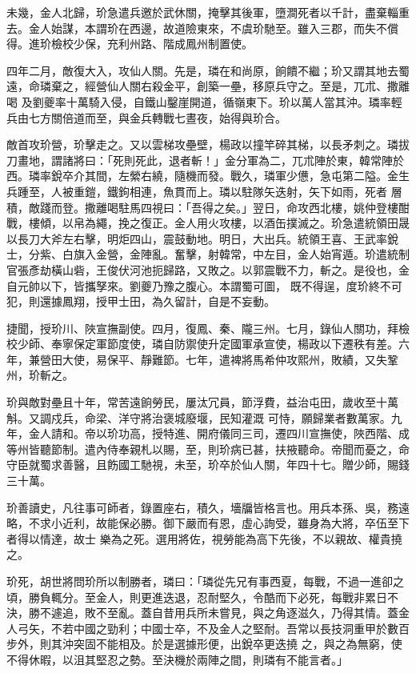 \begin{pinyinscope}
 未幾，金人北歸，玠急遣兵邀於武休關，掩擊其後軍，墮澗死者以千計，盡棄輜重去。金人始謀，本謂玠在西邊，故道險東來，不虞玠馳至。雖入三郡，而失不償得。進玠檢校少保，充利州路、階成鳳州制置使。



 四年二月，敵復大入，攻仙人關。先是，璘在和尚原，餉饋不繼；玠又謂其地去蜀遠，命璘棄之，經營仙人關右殺金平，創築一壘，移原兵守之。至是，兀朮、撒離喝
 及劉夔率十萬騎入侵，自鐵山鑿崖開道，循嶺東下。玠以萬人當其沖。璘率輕兵由七方關倍道而至，與金兵轉戰七晝夜，始得與玠合。



 敵首攻玠營，玠擊走之。又以雲梯攻壘壁，楊政以撞竿碎其梯，以長矛刺之。璘拔刀畫地，謂諸將曰：「死則死此，退者斬！」金分軍為二，兀朮陣於東，韓常陣於西。璘率銳卒介其間，左縈右繞，隨機而發。戰久，璘軍少憊，急屯第二隘。金生兵踵至，人被重鎧，鐵鉤相連，魚貫而上。璘以駐隊矢迭射，矢下如雨，死者
 層積，敵踐而登。撒離喝駐馬四視曰：「吾得之矣。」翌日，命攻西北樓，姚仲登樓酣戰，樓傾，以帛為繩，挽之復正。金人用火攻樓，以酒缶撲滅之。玠急遣統領田晟以長刀大斧左右擊，明炬四山，震鼓動地。明日，大出兵。統領王喜、王武率銳士，分紫、白旗入金營，金陣亂。奮擊，射韓常，中左目，金人始宵遁。玠遣統制官張彥劫橫山砦，王俊伏河池扼歸路，又敗之。以郭震戰不力，斬之。是役也，金自元帥以下，皆攜孥來。劉夔乃豫之腹心。本謂蜀可圖，
 既不得逞，度玠終不可犯，則還據鳳翔，授甲士田，為久留計，自是不妄動。



 捷聞，授玠川、陜宣撫副使。四月，復鳳、秦、隴三州。七月，錄仙人關功，拜檢校少師、奉寧保定軍節度使，璘自防禦使升定國軍承宣使，楊政以下遷秩有差。六年，兼營田大使，易保平、靜難節。七年，遣裨將馬希仲攻熙州，敗績，又失鞏州，玠斬之。



 玠與敵對壘且十年，常苦遠餉勞民，屢汰冗員，節浮費，益治屯田，歲收至十萬斛。又調戍兵，命梁、洋守將治褒城廢堰，民知灌溉
 可恃，願歸業者數萬家。九年，金人請和。帝以玠功高，授特進、開府儀同三司，遷四川宣撫使，陜西階、成等州皆聽節制。遣內侍奉親札以賜，至，則玠病已甚，扶掖聽命。帝聞而憂之，命守臣就蜀求善醫，且飭國工馳視，未至，玠卒於仙人關，年四十七。贈少師，賜錢三十萬。



 玠善讀史，凡往事可師者，錄置座右，積久，墻牖皆格言也。用兵本孫、吳，務遠略，不求小近利，故能保必勝。御下嚴而有恩，虛心詢受，雖身為大將，卒伍至下者得以情達，故士
 樂為之死。選用將佐，視勞能為高下先後，不以親故、權貴撓之。



 玠死，胡世將問玠所以制勝者，璘曰：「璘從先兄有事西夏，每戰，不過一進卻之頃，勝負輒分。至金人，則更進迭退，忍耐堅久，令酷而下必死，每戰非累日不決，勝不遽追，敗不至亂。蓋自昔用兵所未嘗見，與之角逐滋久，乃得其情。蓋金人弓矢，不若中國之勁利；中國士卒，不及金人之堅耐。吾常以長技洞重甲於數百步外，則其沖突固不能相及。於是選據形便，出銳卒更迭撓
 之，與之為無窮，使不得休暇，以沮其堅忍之勢。至決機於兩陣之間，則璘有不能言者。」




\end{pinyinscope}
